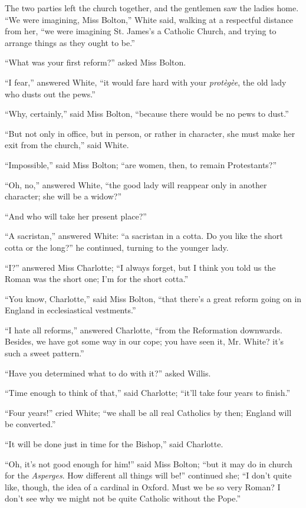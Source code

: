 The two parties left the church together, and the gentlemen saw the
ladies home. ``We were imagining, Miss Bolton,'' White said,
walking at a respectful distance from her, ``we were imagining St.
James's a Catholic Church, and trying to arrange things as they ought
to be.''

``What was your first reform?'' asked Miss Bolton.

``I
fear,'' answered White, ``it would fare hard with your \emph{protègèe},
the old lady who dusts out the pews.''

``Why, certainly,'' said Miss Bolton, ``because there
would be no pews to dust.''

``But not only in office, but in person, or rather in
character, she must make her exit from the church,'' said White.

``Impossible,'' said Miss Bolton; ``are women, then, to
remain Protestants?''

``Oh, no,'' answered White, ``the good lady will
reappear only in another character; she will be a widow?''

``And who will take her present place?''

``A sacristan,'' answered White: ``a sacristan in a
cotta. Do you like the short cotta or the long?'' he continued,
turning to the younger lady.

``I?'' answered Miss Charlotte; ``I always forget, but
I think you told us the Roman was the short one; I'm for the short
cotta.''

``You know, Charlotte,'' said Miss Bolton, ``that there's
a great reform going on in England in ecclesiastical vestments.''

``I hate all reforms,'' answered Charlotte, ``from the
Reformation downwards. Besides, we have got some way in our cope; you
have seen it, Mr. White? it's such a sweet pattern.''

``Have you determined what to do with it?'' asked Willis.

``Time enough to think of that,'' said Charlotte; ``it'll
take four years to finish.''

``Four years!'' cried White; ``we shall be all real
Catholics by then; England will be converted.''

``It will be done just in time for the Bishop,'' said
Charlotte.

``Oh, it's not good enough for him!'' said Miss Bolton;
``but it may do in church for the \emph{Asperges}. How different
all things will be!'' continued she; ``I don't quite like,
though, the idea of a cardinal in Oxford. Must we be so very Roman? I
don't see why we might not be quite Catholic without the Pope.''

